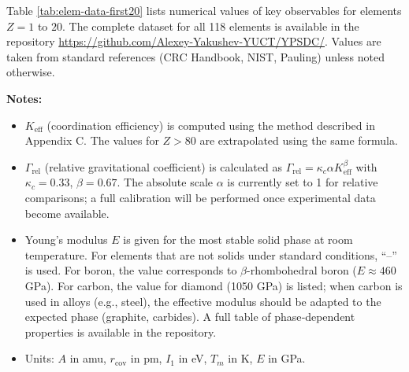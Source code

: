 \documentclass[12pt,a4paper]{article}
\newcommand{\Keff}{K_{\mathrm{eff}}}
\begin{document}
	Table \ref{tab:elem-data-first20} lists numerical values of key observables for elements \(Z=1\) to \(20\). The complete dataset for all 118 elements is available in the repository \url{https://github.com/Alexey-Yakushev-YUCT/YPSDC/}. Values are taken from standard references (CRC Handbook, NIST, Pauling) unless noted otherwise.
	
	\textbf{Notes:}
	\begin{itemize}
		\item \(\Keff\) (coordination efficiency) is computed using the method described in Appendix C. The values for \(Z>80\) are extrapolated using the same formula.
		\item \(\Gamma_{\text{rel}}\) (relative gravitational coefficient) is calculated as \(\Gamma_{\text{rel}} = \kappa_c \alpha \Keff^{\beta}\) with \(\kappa_c=0.33\), \(\beta=0.67\). The absolute scale \(\alpha\) is currently set to 1 for relative comparisons; a full calibration will be performed once experimental data become available.
		\item Young’s modulus \(E\) is given for the most stable solid phase at room temperature. For elements that are not solids under standard conditions, “–” is used. For boron, the value corresponds to \(\beta\)-rhombohedral boron (\(E \approx 460\) GPa). For carbon, the value for diamond (1050 GPa) is listed; when carbon is used in alloys (e.g., steel), the effective modulus should be adapted to the expected phase (graphite, carbides). A full table of phase‑dependent properties is available in the repository.
		\item Units: \(A\) in amu, \(r_{\text{cov}}\) in pm, \(I_1\) in eV, \(T_m\) in K, \(E\) in GPa.
	\end{itemize}
	
\end{document}
